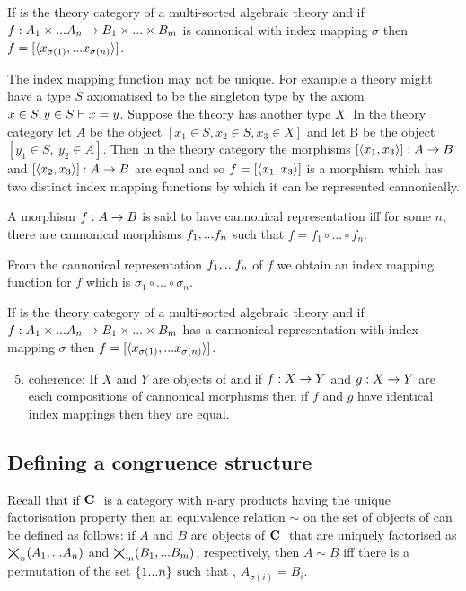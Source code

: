 \documentclass[10pt,a4paper]{scrartcl}
\begin{document}
\begin{observation}
If \catcw is the theory category of a multi-sorted algebraic theory and if
$f: A_1 \times ... A_n \rightarrow B_1 \times ... \times B_m$ is cannonical 
with index mapping $\sigma$ then $f=[\langle x_{\sigma(1)},...x_{\sigma(n)}\rangle]$.
\end{observation}

The index mapping function may not be unique.
For example a theory might have a type $S$ axiomatised to
be the singleton type by the axiom $x \in S, y \in S \vdash x=y$. Suppose
the theory has another type $X$. In the theory category let $A$ be the object $[x_1 \in S, x_2 \in S, x_3 \in X]$
and let B be the object $[y_1 \in S,\ y_2 \in A]$. 
Then in the theory category the morphisms
$[\langle x_1,x_3\rangle]:A \rightarrow B$
and $[\langle x_2,x_3\rangle]:A \rightarrow B$
are equal and so $f=[\langle x_1,x_3\rangle]$ is a morphism which has two distinct index mapping
functions by which it can be represented cannonically.


\begin{definition}
A morphism $f:A \rightarrow B$ is said to have cannonical representation iff for some $n$,
there are cannonical morphisms $f_1,...f_n$ such that $f=f_1 \circ ... \circ f_n$.
\end{definition}

From the cannonical representation $f_1,...f_n$ of $f$ we obtain an index mapping function 
for $f$ which is $\sigma_1 \circ ... \circ \sigma_n$. 

\begin{observation}
If \catcw is the theory category of a multi-sorted algebraic theory and if
$f: A_1 \times ... A_n \rightarrow B_1 \times ... \times B_m$ has a  cannonical 
representation 
with index mapping $\sigma$ then $f=[\langle x_{\sigma(1)},...x_{\sigma(n)}\rangle]$.
\end{observation}


\begin{enumerate}
\setcounter{enumi}{4}
\item coherence:
If $X$ and $Y$ are objects of \catcw and if $f:X \rightarrow Y$ and $g:X \rightarrow Y$ are
each compositions of cannonical morphisms then if $f$ and $g$ have identical 
index mappings then they are equal.
\end{enumerate}

\subsection{Defining a congruence structure}

Recall that if $\textbf{C}\ $ is a category with n-ary products having the unique factorisation property then an
equivalence relation  $\sim$ on the set of objects of \catcw can be defined as follows:
if $A$ and $B$ are objects of $\textbf{C}\ $ that are uniquely factorised as $\bigtimes_{n}(A_1,...A_n)$ and $\bigtimes_{m}(B_1,...B_m)$, respectively, then 
$A \sim B$ iff  there is a permutation of the set $\left\{1...n\right\}$ such that 
\foreachi, $A_{\sigma(i)}=B_i$. 
\end{document}
